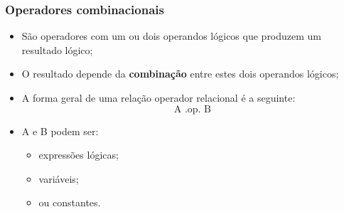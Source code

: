 \documentclass[xcolor=table]{beamer}
\newenvironment{stepitemize}{\begin{itemize}[<+->]}{\end{itemize} }
\begin{document}
\begin{frame}%

\frametitle{Operadores combinacionais}

\begin{stepitemize}
\item S\~{a}o operadores com um ou dois operandos l\'{o}gicos que produzem
um resultado l\'{o}gico;

\item O resultado depende da \textbf{combina\c{c}\~{a}o} entre estes dois
operandos l\'{o}gicos;

\item A forma geral de uma rela\c{c}\~{a}o operador relacional \'{e} a
seguinte:%
\[
\text{A .op. B} 
\]

\item A e B podem ser:

\begin{itemize}
\item express\~{o}es l\'{o}gicas;

\item vari\'{a}veis;

\item ou constantes.
\end{itemize}
\end{stepitemize}

\transboxout%
\end{frame}%
\end{document}

